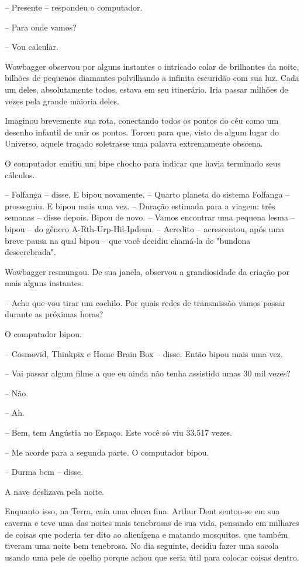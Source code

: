 \documentclass[eps,11pt]{book}
\begin{document}
-- Presente -- respondeu o computador.

-- Para onde vamos?

-- Vou calcular.

Wowbagger observou por alguns instantes o intricado colar de brilhantes da noite, bilhões de pequenos diamantes polvilhando a infinita escuridão com sua luz. Cada um deles, absolutamente todos, estava em seu itinerário. Iria passar milhões de vezes pela grande maioria deles.

Imaginou brevemente sua rota, conectando todos os pontos do céu como um desenho infantil de unir os pontos. Torceu para que, visto de algum lugar do Universo, aquele traçado soletrasse uma palavra extremamente obscena.

O computador emitiu um bipe chocho para indicar que havia terminado seus cálculos.

-- Folfanga -- disse. E bipou novamente. -- Quarto planeta do sistema Folfanga -- prosseguiu. E bipou mais uma vez. -- Duração estimada para a viagem: três semanas -- disse depois. Bipou de novo. -- Vamos encontrar uma pequena lesma -- bipou -- do gênero A-Rth-Urp-Hil-Ipdenu. -- Acredito -- acrescentou, após uma breve pausa na qual bipou -- que você decidiu chamá-la de "bundona descerebrada".

Wowbagger resmungou. De sua janela, observou a grandiosidade da criação por mais alguns instantes.

-- Acho que vou tirar um cochilo. Por quais redes de transmissão vamos passar durante as próximas horas?

O computador bipou.

-- Cosmovid, Thinkpix e Home Brain Box -- disse. Então bipou mais uma vez.

-- Vai passar algum filme a que eu ainda não tenha assistido umas 30 mil vezes?

-- Não.

-- Ah.

-- Bem, tem Angústia no Espaço. Este você só viu 33.517 vezes.

-- Me acorde para a segunda parte. O computador bipou.

-- Durma bem -- disse.

A nave deslizava pela noite.

Enquanto isso, na Terra, caía uma chuva fina. Arthur Dent sentou-se em sua caverna e teve uma das noites mais tenebrosas de sua vida, pensando em milhares de coisas que poderia ter dito ao alienígena e matando mosquitos, que também tiveram uma noite bem tenebrosa.
No dia seguinte, decidiu fazer uma sacola usando uma pele de coelho porque achou que seria útil para colocar coisas dentro.
\end{document}
